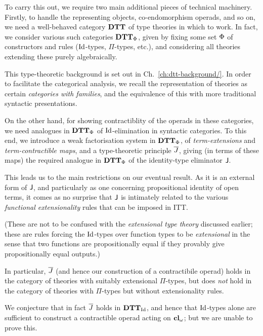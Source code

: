 \begin{para}
To carry this out, we require two main additional pieces of technical machinery.  Firstly, to handle the representing objects, co-endomorphism operads, and so on, we need a well-behaved category $\mathbf{DTT}$ of type theories in which to work.  In fact, we consider various such categories $\mathbf{DTT}_{\Phi}$, given by fixing some set ${\Phi}$ of constructors and rules ($\mathrm{Id}$-types, $\Pi$-types, etc.), and considering all theories extending these purely algebraically.

This type-theoretic background is set out in Ch.~\ref{ch:dtt-background/}.  In order to facilitate the categorical analysis, we recall the representation of theories as certain \emph{categories with families}, and the equivalence of this with more traditional syntactic presentations.

On the other hand, for showing contractiblity of the operads in these categories, we need analogues in $\mathbf{DTT}_{\Phi}$ of $\mathrm{Id}$-elimination in syntactic categories.  To this end, we introduce a weak factorisation system in $\mathbf{DTT}_{\Phi}$, of \emph{term-extensions} and \emph{term-contractible maps}, and a type-theoretic principle $\overline{J}$, giving (in terms of these maps) the required analogue in $\mathbf{DTT}_{\Phi}$ of the identity-type eliminator $\mathsf{J}$.
\end{para}

\begin{para}
This leads us to the main restrictions on our eventual result.  As it is an external form of $\mathsf{J}$, and particularly as one concerning propositional identity of open terms, it comes as no surprise that $\mathsf{J}$ is intimately related to the various \emph{functional extensionality} rules that can be imposed in ITT.

(These are not to be confused with the \emph{extensional type theory} discussed earlier; these are rules forcing the $\mathrm{Id}$-types over function types to be \emph{extensional} in the sense that two functions are propositionally equal if they provably give propositionally equal outputs.)

In particular, $\overline{J}$ (and hence our construction of a contractibile operad) holds in the category of theories with suitably extensional $\Pi$-types, but does \emph{not} hold in the category of theories with $\Pi$-types but without extensionality rules.  

We conjecture that in fact $\overline{J}$ holds in $\mathbf{DTT}_{\mathrm{Id}}$, and hence that $\mathrm{Id}$-types alone are sufficient to construct a contractible operad acting on $\mathbf{cl}_\omega$; but we are unable to prove this.
\end{para}

